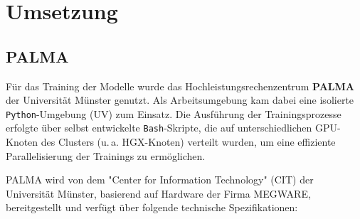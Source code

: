 


\section{Umsetzung}
\subsection{PALMA}

Für das Training der Modelle wurde das Hochleistungsrechenzentrum \textbf{PALMA} der Universität Münster genutzt. Als Arbeitsumgebung kam dabei eine isolierte \texttt{Python}-Umgebung (UV) zum Einsatz. Die Ausführung der Trainingsprozesse erfolgte über selbst entwickelte \texttt{Bash}-Skripte, die auf unterschiedlichen GPU-Knoten des Clusters (u.\,a. HGX-Knoten) verteilt wurden, um eine effiziente Parallelisierung der Trainings zu ermöglichen.

PALMA wird von dem "Center for Information Technology" (CIT) der Universität Münster, basierend auf Hardware der Firma MEGWARE, bereitgestellt\cite{palma_spec} und verfügt über folgende technische Spezifikationen:

